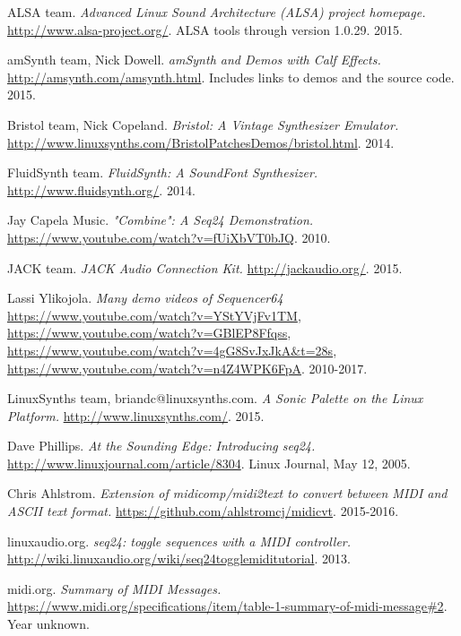 \begin{thebibliography}{99}

   ALSA team.
   \emph{Advanced Linux Sound Architecture (ALSA) project homepage.}
   \url{http://www.alsa-project.org/}.
   ALSA tools through version 1.0.29.
   2015.

   amSynth team, Nick Dowell.
   \emph{amSynth and Demos with Calf Effects.}
   \url{http://amsynth.com/amsynth.html}.
   Includes links to demos and the source code.
   2015.

   Bristol team, Nick Copeland.
   \emph{Bristol: A Vintage Synthesizer Emulator.}
   \url{http://www.linuxsynths.com/BristolPatchesDemos/bristol.html}.
   2014.

   FluidSynth team.
   \emph{FluidSynth: A SoundFont Synthesizer.}
   \url{http://www.fluidsynth.org/}.
   2014.

   Jay Capela Music.
   \emph{"Combine": A Seq24 Demonstration.}
   \url{https://www.youtube.com/watch?v=fUiXbVT0bJQ}.
   2010.

   JACK team.
   \emph{JACK Audio Connection Kit.}
   \url{http://jackaudio.org/}.
   2015.

   Lassi Ylikojola.
   \emph{Many demo videos of Sequencer64}
   \url{https://www.youtube.com/watch?v=YStYVjFv1TM},
   \url{https://www.youtube.com/watch?v=GBlEP8Ffqss},
   \url{https://www.youtube.com/watch?v=4gG8SvJxJkA&t=28s},
   \url{https://www.youtube.com/watch?v=n4Z4WPK6FpA}.
   2010-2017.

   LinuxSynths team, briandc@linuxsynths.com.
   \emph{A Sonic Palette on the Linux Platform.}
   \url{http://www.linuxsynths.com/}.
   2015.

   Dave Phillips.
   \emph{At the Sounding Edge: Introducing seq24.}
   \url{http://www.linuxjournal.com/article/8304}.
   Linux Journal, May 12, 2005.

   Chris Ahlstrom.
   \emph{Extension of midicomp/midi2text to convert between MIDI and ASCII
      text format.}
   \url{https://github.com/ahlstromcj/midicvt}.
   2015-2016.

   linuxaudio.org.
   \emph{seq24: toggle sequences with a MIDI controller.}
   \url{http://wiki.linuxaudio.org/wiki/seq24togglemiditutorial}.
   2013.

   midi.org.
   \emph{Summary of MIDI Messages.}
   \url{https://www.midi.org/specifications/item/table-1-summary-of-midi-message#2}.
   Year unknown.


\end{thebibliography}
